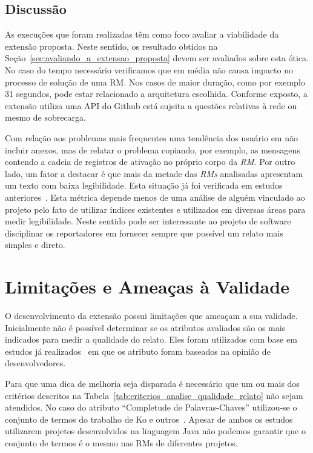 \subsection{Discussão}
\label{sub:implemtacao_extensao_avaliacao_discussao}

As execuções que foram realizadas têm como foco avaliar a viabilidade da
extensão proposta. Neste sentido, os resultado obtidos na
Seção~\ref{sec:avaliando_a_extensao_proposta} devem ser avaliados sobre esta
ótica. No caso do tempo necessário verificamos que em média não causa impacto no
processo de solução de uma RM\@. Nos casos de maior duração, como por exemplo 31
segundos, pode estar relacionado a arquitetura escolhida. Conforme exposto, a
extensão utiliza uma API do Github está sujeita a questões relativas à rede ou
mesmo de sobrecarga.

Com relação aos problemas mais frequentes uma tendência dos usuário em não
incluir anexos, mas de relatar o problema copiando, por exemplo, as mensagens
contendo a cadeia de registros de ativação no próprio corpo da \textit{RM}. Por
outro lado, um fator a destacar é que mais da metade das \textit{RMs} analisadas
apresentam um texto com baixa legibilidade. Esta situação já foi verificada em
estudos anteriores~\cite{ko2006linguistic, bettenburg2007quality}. Esta métrica
depende menos de uma análise de alguém vinculado ao projeto pelo fato de
utilizar índices existentes e utilizados em diversas áreas para medir
legibilidade. Neste sentido pode ser interessante ao projeto de software
disciplinar os reportadores em fornecer sempre que possível um relato mais
simples e direto.

\section{Limitações e Ameaças à Validade}
\label{sec:limitações_e_ameças_à_validade}

O desenvolvimento da extensão possui limitações que ameaçam a sua validade.
Inicialmente não é possível determinar se os atributos avaliados são os mais
indicados para medir a qualidade do relato. Eles foram utilizados com base em
estudos já realizados~\cite{bettenburg2007quality} em que os atributo foram
baseados na opinião de desenvolvedores.

Para que uma dica de melhoria seja disparada é necessário que um ou mais dos
critérios descritos na Tabela~\ref{tab:criterios_analise_qualidade_relato} não
sejam atendidos. No caso do atributo ``Completude de Palavras-Chaves''
utilizou-se o conjunto de termos do trabalho de Ko e
outros~\cite{ko2006linguistic}. Apesar de ambos os estudos utilizarem projetos
desenvolvidos na linguagem Java não podemos garantir que o conjunto de termos é
o mesmo nas RMs de diferentes projetos.

